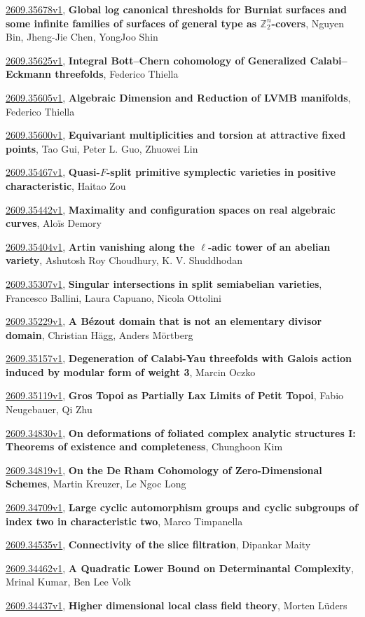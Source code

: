 \documentclass[9pt, a4paper]{article}
\theoremstyle{plain}
\theoremstyle{definition}
\theoremstyle{remark}
\newcommand{\arxiv}[3]{\href{https://arxiv.org/abs/#1}{#1}, \textbf{\textcolor{arxivblue}{#2}}, #3}
\begin{document}
\arxiv{2609.35678v1}{Global log canonical thresholds for Burniat surfaces and some infinite families of surfaces of general type as $\mathbb{Z}_2^n$-covers}{Nguyen Bin, Jheng-Jie Chen, YongJoo Shin}

\arxiv{2609.35625v1}{Integral Bott--Chern cohomology of Generalized Calabi--Eckmann threefolds}{Federico Thiella}

\arxiv{2609.35605v1}{Algebraic Dimension and Reduction of LVMB manifolds}{Federico Thiella}

\arxiv{2609.35600v1}{Equivariant multiplicities and torsion at attractive fixed points}{Tao Gui, Peter L. Guo, Zhuowei Lin}

\arxiv{2609.35467v1}{Quasi-$F$-split primitive symplectic varieties in positive characteristic}{Haitao Zou}

\arxiv{2609.35442v1}{Maximality and configuration spaces on real algebraic curves}{Aloïs Demory}

\arxiv{2609.35404v1}{Artin vanishing along the $\ell$-adic tower of an abelian variety}{Ashutosh Roy Choudhury, K. V. Shuddhodan}

\arxiv{2609.35307v1}{Singular intersections in split semiabelian varieties}{Francesco Ballini, Laura Capuano, Nicola Ottolini}

\arxiv{2609.35229v1}{A Bézout domain that is not an elementary divisor domain}{Christian Hägg, Anders Mörtberg}

\arxiv{2609.35157v1}{Degeneration of Calabi-Yau threefolds with Galois action induced by modular form of weight 3}{Marcin Oczko}

\arxiv{2609.35119v1}{Gros Topoi as Partially Lax Limits of Petit Topoi}{Fabio Neugebauer, Qi Zhu}

\arxiv{2609.34830v1}{On deformations of foliated complex analytic structures I: Theorems of existence and completeness}{Chunghoon Kim}

\arxiv{2609.34819v1}{On the De Rham Cohomology of Zero-Dimensional Schemes}{Martin Kreuzer, Le Ngoc Long}

\arxiv{2609.34709v1}{Large cyclic automorphism groups and cyclic subgroups of index two in characteristic two}{Marco Timpanella}

\arxiv{2609.34535v1}{Connectivity of the slice filtration}{Dipankar Maity}

\arxiv{2609.34462v1}{A Quadratic Lower Bound on Determinantal Complexity}{Mrinal Kumar, Ben Lee Volk}

\arxiv{2609.34437v1}{Higher dimensional local class field theory}{Morten Lüders}
\end{document}
